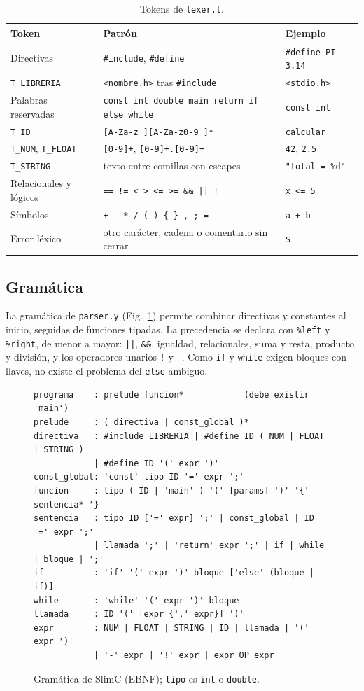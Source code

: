 \documentclass[runningheads]{llncs}
\begin{document}
\begin{table}[t]
\caption{Tokens de \texttt{lexer.l}.}\label{tab:tok}
\centering\footnotesize
\begin{tabular}{@{}p{38mm}p{42mm}p{30mm}@{}}
\toprule
Token & Patrón & Ejemplo\\
\midrule
Directivas & \texttt{\#include}, \texttt{\#define} & \texttt{\#define PI 3.14}\\
\texttt{T\_LIBRERIA} & \texttt{<nombre.h>} tras \texttt{\#include} & \texttt{<stdio.h>}\\
Palabras reservadas & \texttt{const int double main return if else while} & \texttt{const int}\\
\texttt{T\_ID} & \texttt{[A-Za-z\_][A-Za-z0-9\_]*} & \texttt{calcular}\\
\texttt{T\_NUM}, \texttt{T\_FLOAT} & \texttt{[0-9]+}, \texttt{[0-9]+.[0-9]+} & \texttt{42}, \texttt{2.5}\\
\texttt{T\_STRING} & texto entre comillas con escapes & \texttt{"total = \%d"}\\
Relacionales y lógicos & \texttt{== != < > <= >= \&\& || !} & \texttt{x <= 5}\\
Símbolos & \texttt{+ - * / ( ) \{ \} , ; =} & \texttt{a + b}\\
Error léxico & otro carácter, cadena o comentario sin cerrar & \texttt{\$}\\
\bottomrule
\end{tabular}
\end{table}

\subsection{Gramática}
La gramática de \texttt{parser.y} (Fig.~\ref{lst:gram}) permite combinar directivas y constantes al inicio, seguidas de funciones tipadas. La precedencia se declara con \texttt{\%left} y \texttt{\%right}, de menor a mayor: \texttt{||}, \texttt{\&\&}, igualdad, relacionales, suma y resta, producto y división, y los operadores unarios \texttt{!} y \texttt{-}. Como \texttt{if} y \texttt{while} exigen bloques con llaves, no existe el problema del \texttt{else} ambiguo.

\begin{figure}[t]
\begin{lstlisting}
programa    : prelude funcion*            (debe existir 'main')
prelude     : ( directiva | const_global )*
directiva   : #include LIBRERIA | #define ID ( NUM | FLOAT | STRING )
            | #define ID '(' expr ')'
const_global: 'const' tipo ID '=' expr ';'
funcion     : tipo ( ID | 'main' ) '(' [params] ')' '{' sentencia* '}'
sentencia   : tipo ID ['=' expr] ';' | const_global | ID '=' expr ';'
            | llamada ';' | 'return' expr ';' | if | while | bloque | ';'
if          : 'if' '(' expr ')' bloque ['else' (bloque | if)]
while       : 'while' '(' expr ')' bloque
llamada     : ID '(' [expr {',' expr}] ')'
expr        : NUM | FLOAT | STRING | ID | llamada | '(' expr ')'
            | '-' expr | '!' expr | expr OP expr
\end{lstlisting}
\caption{Gramática de SlimC (EBNF); \texttt{tipo} es \texttt{int} o \texttt{double}.}\label{lst:gram}
\end{figure}
\end{document}
